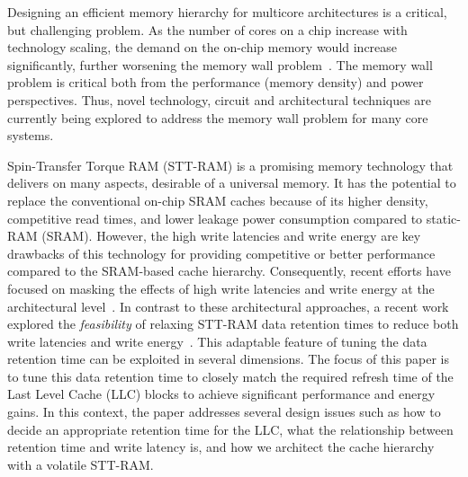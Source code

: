 
Designing an efficient memory hierarchy for multicore architectures is a critical, but challenging
problem. As the number of cores on a chip increase with technology scaling, the demand on the on-chip
memory would increase significantly, further worsening the memory wall problem~\cite{BurgerGK96}. The
memory wall problem is critical both from the performance (memory density) and power perspectives.
Thus, novel technology, circuit and architectural techniques are currently being explored to address
the memory wall problem for many core systems.





Spin-Transfer Torque RAM (STT-RAM) is a promising memory technology that delivers on many aspects,
desirable of a universal memory. It has the potential to replace the conventional on-chip SRAM
caches because of its higher density, competitive read times, and lower leakage power consumption
compared to static-RAM (SRAM). However, the high write latencies and write energy are key drawbacks
of this technology for providing competitive or better performance compared to the SRAM-based cache
hierarchy. Consequently, recent efforts have focused on masking the effects of high write latencies
and write energy at the architectural level~\cite{mram-energy-reduction,gsun-hpca}. In contrast to
these architectural approaches, a recent  work explored the {\it feasibility} of relaxing STT-RAM
data retention times to reduce both write latencies and write energy~\cite{STTRAM:HPCA11}. This
adaptable feature of tuning the data retention time can be exploited in several dimensions. The focus
of this paper is to tune this data retention time to closely match the required refresh time of the Last
Level Cache (LLC) blocks to achieve significant performance and energy gains. In this context, the paper
addresses several design issues such as how to decide an appropriate retention time for the LLC, 
what the relationship between retention time and write latency is, and how we
architect the cache hierarchy with a volatile STT-RAM.

